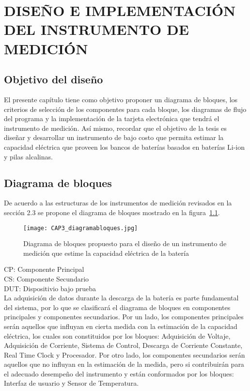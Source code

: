 \chapter{DISEÑO E IMPLEMENTACIÓN DEL INSTRUMENTO DE MEDICIÓN}

\section{Objetivo del diseño}

El presente capítulo tiene como objetivo proponer un diagrama de bloques, los criterios de selección de los componentes para cada bloque, los diagramas de flujo del programa y la implementación de la tarjeta electrónica que tendrá el instrumento de medición. Así mismo, recordar que el objetivo de la tesis es diseñar y desarrollar un instrumento de bajo costo que permita estimar la capacidad eléctrica que proveen los bancos de baterías basados en baterías Li-ion y pilas alcalinas. 

\section{Diagrama de bloques}

De acuerdo a las estructuras de los instrumentos de medición revisados en la sección 2.3 se propone el diagrama de bloques mostrado en la figura~\ref{fig:diagramabloques}.

\begin{figure}[htbp]
\centering
\texttt{[image: CAP3\_diagramabloques.jpg]}
\caption{Diagrama de bloques propuesto para el diseño de un instrumento de medición que estime la capacidad eléctrica de la batería}
\label{fig:diagramabloques}
\end{figure}

CP: Componente Principal	     \\
CS: Componente Secundario  \\
DUT: Dispositivio bajo prueba \\

La adquisición de datos durante la descarga de la batería es parte fundamental del sistema, por lo que se clasificará el diagrama de bloques en componentes principales y componentes secundarios. Por un lado, los componentes principales serán aquellos que influyan en cierta medida con la estimación de la capacidad eléctrica, los cuales son constituidos por los bloques: Adquisición de Voltaje, Adquisición de Corriente, Sistema de Control, Descarga de Corriente Constante, Real Time Clock y Procesador. Por otro lado, los componentes secundarios serán aquellos que no influyan en la estimación de la medida, pero si contribuirán para el adecuado desempeño del instrumento y están conformados por los bloques: Interfaz de usuario y Sensor de Temperatura. 

